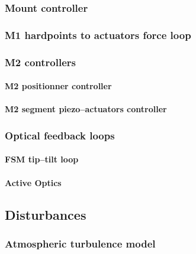\documentclass{gmto}
\begin{document}
\subsubsection{Mount controller}
\label{sec:mount-ctrl}

\subsubsection{M1 hardpoints to actuators force loop }
\label{sec:m1-ctrl}

\cite{GMT.DOC.05153}

\subsubsection{M2 controllers}
\label{sec:m2-ctrl}

\cite{GMT.DOC.05154}

\paragraph{M2 positionner controller}

\paragraph{M2 segment piezo--actuators controller}

\subsubsection{Optical feedback loops}
\label{sec:optics-ctrl}

\paragraph{FSM tip--tilt loop}


\paragraph{Active Optics}


\clearpage
\subsection{Disturbances}
\label{sec:disturbances}

\subsubsection{Atmospheric turbulence model}
\label{sec:atm}
\end{document}
